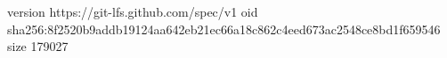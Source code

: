 version https://git-lfs.github.com/spec/v1
oid sha256:8f2520b9addb19124aa642eb21ec66a18c862c4eed673ac2548ce8bd1f659546
size 179027
